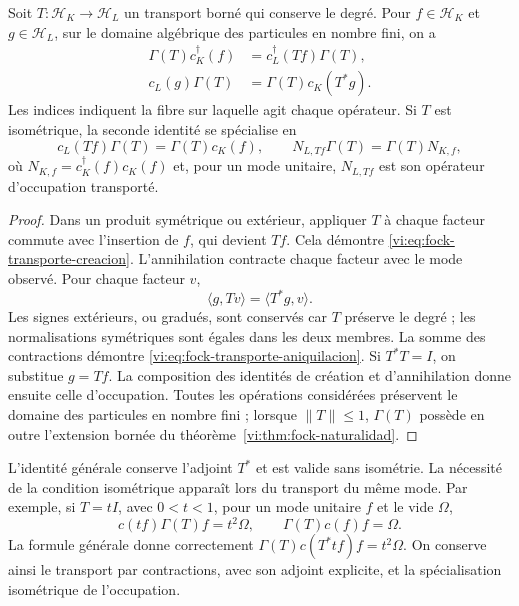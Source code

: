 \begin{proposition}
\label{vi:prop:fock-transporte-adjunto}
Soit \(T:\mathcal H_K\to\mathcal H_L\) un transport borné
qui conserve le degré. Pour \(f\in\mathcal H_K\) et
\(g\in\mathcal H_L\), sur le domaine algébrique des particules
en nombre fini, on a
\begin{align}
 \Gamma(T)c_K^\dagger(f)
 &=c_L^\dagger(Tf)\Gamma(T),
 \label{vi:eq:fock-transporte-creacion}\\
 c_L(g)\Gamma(T)
 &=\Gamma(T)c_K(T^*g).
 \label{vi:eq:fock-transporte-aniquilacion}
\end{align}
Les indices indiquent la fibre sur laquelle agit chaque opérateur.
Si \(T\) est isométrique, la seconde identité se spécialise en
\[
 c_L(Tf)\Gamma(T)=\Gamma(T)c_K(f),
 \qquad
 N_{L,Tf}\Gamma(T)=\Gamma(T)N_{K,f},
\]
où \(N_{K,f}=c_K^\dagger(f)c_K(f)\) et, pour un mode unitaire,
\(N_{L,Tf}\) est son opérateur d’occupation transporté.
\end{proposition}
\begin{proof}
Dans un produit symétrique ou extérieur, appliquer \(T\) à chaque facteur
commute avec l’insertion de \(f\), qui devient \(Tf\). Cela
démontre \eqref{vi:eq:fock-transporte-creacion}. L’annihilation
contracte chaque facteur avec le mode observé. Pour chaque facteur \(v\),
\[
 \langle g,Tv\rangle=\langle T^*g,v\rangle.
\]
Les signes extérieurs, ou gradués, sont conservés car \(T\)
préserve le degré ; les normalisations symétriques sont égales dans
les deux membres. La somme des contractions démontre
\eqref{vi:eq:fock-transporte-aniquilacion}. Si \(T^*T=I\), on
substitue \(g=Tf\). La composition des identités de création
et d’annihilation donne ensuite celle d’occupation. Toutes les opérations
considérées préservent le domaine des particules en nombre fini ; lorsque
\(\|T\|\le1\), \(\Gamma(T)\) possède en outre l’extension bornée
du théorème~\ref{vi:thm:fock-naturalidad}.
\end{proof}

L’identité générale conserve l’adjoint \(T^*\) et est valide sans
isométrie. La nécessité de la condition isométrique apparaît lors du
transport du même mode. Par exemple, si \(T=tI\), avec
\(0<t<1\), pour un mode unitaire \(f\) et le vide \(\Omega\),
\[
 c(tf)\Gamma(T)f=t^2\Omega,
 \qquad \Gamma(T)c(f)f=\Omega.
\]
La formule générale donne correctement
\(\Gamma(T)c(T^*tf)f=t^2\Omega\). On conserve ainsi le
transport par contractions, avec son adjoint explicite, et la
spécialisation isométrique de l’occupation.

